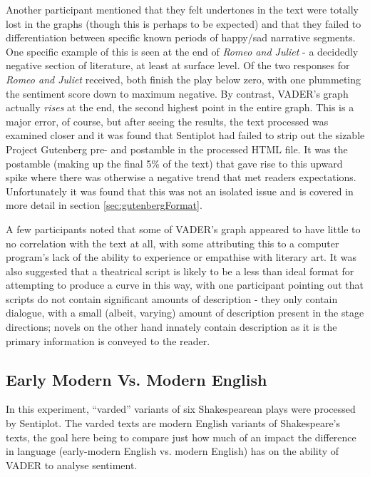 \documentclass{article}
\begin{document}
                Another participant mentioned that they felt undertones in the text were totally lost in the graphs (though this is perhaps to be expected) and that they failed to differentiation between specific known periods of happy/sad narrative segments. One specific example of this is seen at the end of \textit{Romeo and Juliet} - a decidedly negative section of literature, at least at surface level. Of the two responses for \textit{Romeo and Juliet} received, both finish the play below zero, with one plummeting the sentiment score down to maximum negative. By contrast, VADER's graph actually \textit{rises} at the end, the second highest point in the entire graph. This is a major error, of course, but after seeing the results, the text processed was examined closer and it was found that Sentiplot had failed to strip out the sizable Project Gutenberg pre- and postamble in the processed HTML file. It was the postamble (making up the final 5\% of the text) that gave rise to this upward spike where there was otherwise a negative trend that met readers expectations. Unfortunately it was found that this was not an isolated issue and is covered in more detail in section \ref{sec:gutenbergFormat}.
                
                A few participants noted that some of VADER's graph appeared to have little to no correlation with the text at all, with some attributing this to a computer program's lack of the ability to experience or empathise with literary art. It was also suggested that a theatrical script is likely to be a less than ideal format for attempting to produce a curve in this way, with one participant pointing out that scripts do not contain significant amounts of description - they only contain dialogue, with a small (albeit, varying) amount of description present in the stage directions; novels on the other hand innately contain description as it is the primary information is conveyed to the reader.
    \subsection{Early Modern Vs. Modern English}
    \label{subsec:EMvME}
        In this experiment, ``varded'' variants of six Shakespearean plays were processed by Sentiplot. The varded texts are modern English variants of Shakespeare's texts, the goal here being to compare just how much of an impact the difference in language (early-modern English vs. modern English) has on the ability of VADER to analyse sentiment.
\end{document}
